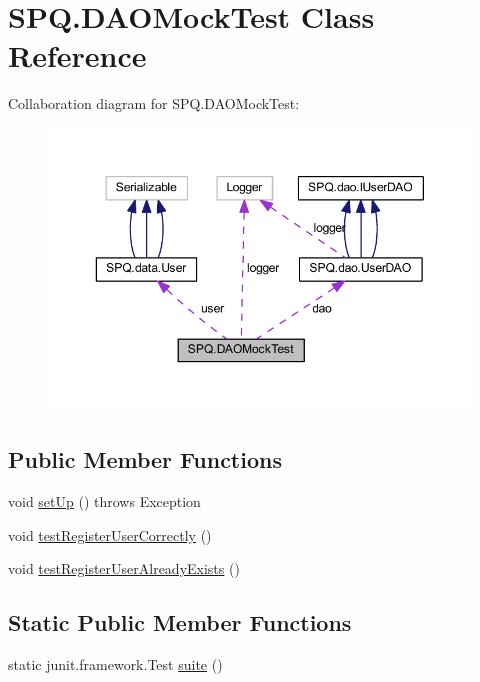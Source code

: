 \hypertarget{class_s_p_q_1_1_d_a_o_mock_test}{}\section{S\+P\+Q.\+D\+A\+O\+Mock\+Test Class Reference}
\label{class_s_p_q_1_1_d_a_o_mock_test}


Collaboration diagram for S\+P\+Q.\+D\+A\+O\+Mock\+Test\+:
\nopagebreak
\begin{figure}[H]
\begin{center}
\leavevmode
\includegraphics[width=350pt]{class_s_p_q_1_1_d_a_o_mock_test__coll__graph}
\end{center}
\end{figure}
\subsection*{Public Member Functions}
\begin{DoxyCompactItemize}
\item 
void \mbox{\hyperlink{class_s_p_q_1_1_d_a_o_mock_test_a14661ea54177083c2de25c20e54f5436}{set\+Up}} ()  throws Exception 
\item 
void \mbox{\hyperlink{class_s_p_q_1_1_d_a_o_mock_test_a52505d1cfefe105f8098147df9d2fce0}{test\+Register\+User\+Correctly}} ()
\item 
void \mbox{\hyperlink{class_s_p_q_1_1_d_a_o_mock_test_a76004a006ddce595edc7011aafccbe7e}{test\+Register\+User\+Already\+Exists}} ()
\end{DoxyCompactItemize}
\subsection*{Static Public Member Functions}
\begin{DoxyCompactItemize}
\item 
static junit.\+framework.\+Test \mbox{\hyperlink{class_s_p_q_1_1_d_a_o_mock_test_a940e298a31bfdb331a7fdd7a5655e270}{suite}} ()
\end{DoxyCompactItemize}


